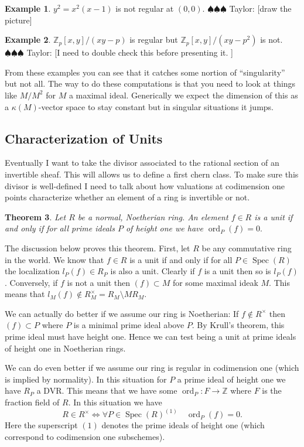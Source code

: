 \documentclass[12pt]{article}
\numberwithin{equation}{section}
\newtheorem{theorem}{Theorem}[subsection]
\theoremstyle{definition}
\newtheorem{example}[theorem]{Example}
\theoremstyle{remark}
\newcommand{\ZZ}{\mathbb{Z}}
\newcommand{\Spec}{\operatorname{Spec}}
\newcommand{\ord}{\operatorname{ord}}
\newcommand{\taylor}[1]{{\color{blue} \sf $\spadesuit\spadesuit\spadesuit$ Taylor: [#1]}}
\begin{document}
\begin{example}
	$y^2=x^2(x-1)$ is not regular at $(0,0)$. \taylor{draw the picture}
\end{example}

\begin{example}
	$\ZZ_p[x,y]/(xy-p)$ is regular but $\ZZ_p[x,y]/(xy-p^2)$ is not. \taylor{I need to double check this before presenting it. }
\end{example}

From these examples you can see that it catches some nortion of ``singularity'' but not all. The way to do these computations is that you need to look at things like $M/M^2$ for $M$ a maximal ideal. 
Generically we expect the dimension of this as a $\kappa(M)$-vector space to stay constant but in singular situations it jumps.

\subsection{Characterization of Units}
Eventually I want to take the divisor associated to the rational section of an invertible sheaf. 
This will allows us to define a first chern class. 
To make sure this divisor is well-defined I need to talk about how valuations at codimension one points characterize whether an element of a ring is invertible or not.

\begin{theorem}
	Let $R$ be a normal, Noetherian ring. 
	An element $f \in R$ is a unit if and only if for all prime ideals $P$ of height one we have $\ord_P(f)=0.$
\end{theorem}
The discussion below proves this theorem.
First, let $R$ be any commutative ring in the world. 
We know that $f\in R$ is a unit if and only if for all $P\in \Spec(R)$ the localization $l_P(f) \in R_P$ is also a unit. 
Clearly if $f$ is a unit then so is $l_P(f)$. 
Conversely, if $f$ is not a unit then $(f) \subset M$ for some maximal ideak $M$.
This means that $l_M(f) \notin R_M^{\times} = R_M\setminus MR_M$.

We can actually do better if we assume our ring is Noetherian: If $f \notin R^{\times}$ then $(f) \subset P$ where $P$ is a minimal prime ideal above $P$. 
By Krull's theorem, this prime ideal must have height one. 
Hence we can test being a unit at prime ideals of height one in Noetherian rings. 

We can do even better if we assume our ring is regular in codimension one (which is implied by normality). 
In this situation for $P$ a prime ideal of height one we have $R_P$ a DVR. 
This means that we have some $\ord_P: F \to \ZZ$ where $F$ is the fraction field of $R$.
In this situation we have 
$$ R \in R^{\times} \iff \forall P \in \Spec(R)^{(1)} \quad \ord_P(f)=0.$$
Here the superscript $(1)$ denotes the prime ideals of height one (which correspond to codimension one subschemes).
\end{document}
